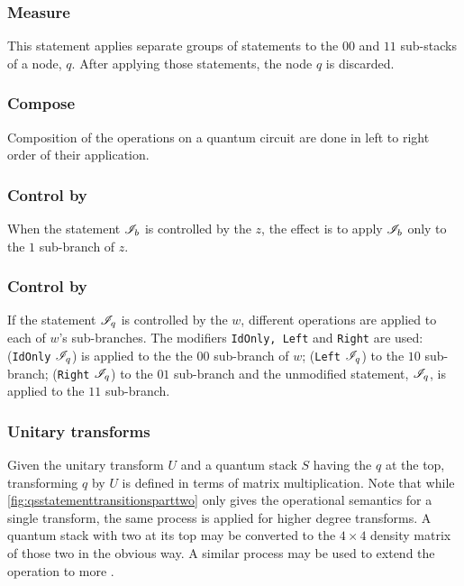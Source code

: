 \subsubsection{Measure}\label{subsubsec:measuretransitions}
This statement applies separate groups of statements 
to  the $00$ and $11$ sub-stacks of a \qbit{} node, $q$. After applying those
statements, the node $q$ is discarded.


\subsubsection{Compose}\label{subsubsec:composeqstacktransitions}
Composition of the operations on a quantum circuit are done in left to right 
order of their application.


\subsubsection{Control by \bit}
When the statement $\mathscr{I}_b$ is controlled by the \bit{} $z$, the effect is to
apply $\mathscr{I}_b$ only to the $1$ sub-branch of $z$.

\subsubsection{Control by \qbit{}}
If the statement $\mathscr{I}_q$ is controlled 
by the \qbit{} $w$, different operations
are applied to each of $w$'s sub-branches. The modifiers \texttt{IdOnly, Left}
and \texttt{Right} are used: (\texttt{IdOnly} $\mathscr{I}_q$) is applied to the
the $00$ sub-branch of $w$; (\texttt{Left} $\mathscr{I}_q$) to the $10$ sub-branch;
(\texttt{Right} $\mathscr{I}_q$) to the $01$ sub-branch and the unmodified
statement, $\mathscr{I}_q$, is applied to the $11$ sub-branch.

\subsubsection{Unitary transforms}
Given the unitary transform $U$ and a quantum stack $S$ having the
\qbit{} $q$ at the top, transforming $q$ by $U$ is defined in
terms of matrix multiplication. Note that while 
\ref{fig:qsstatementtransitionsparttwo} only gives the 
operational semantics for a single \qbit{} transform, the
same process is applied for higher degree transforms. A 
quantum stack with two \qbits{} at its top may be converted to 
the $ 4\times4 $ density matrix of those two \qbits{} in the obvious way.
A similar process may be used to extend the operation to more \qbits.

